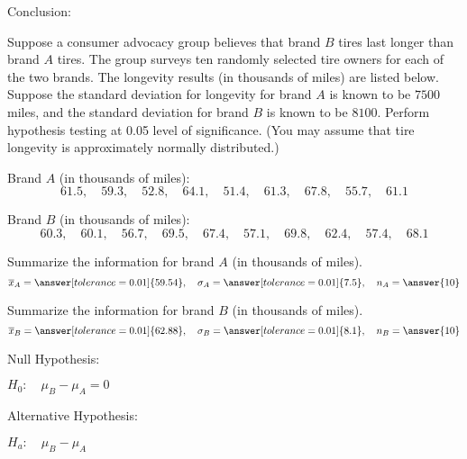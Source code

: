 \documentclass{ximera}
\begin{document}
\begin{problem}
Conclusion:

\begin{multipleChoice} 
\end{multipleChoice} 
\end{problem}

\begin{problem}\label{prob:140quiz12prob2}
Suppose a consumer advocacy group believes that brand $B$ tires last longer than brand $A$ tires.  The group surveys ten randomly selected tire owners for each of the two brands.  The longevity results (in thousands of miles) are listed below.  Suppose the standard deviation for longevity for brand $A$ is known to be $7500$ miles, and the standard deviation for brand $B$ is known to be $8100$.  Perform hypothesis testing at 0.05 level of significance. (You may assume that tire longevity is approximately normally distributed.)

Brand $A$ (in thousands of miles): $$61.5,\quad 59.3,\quad 52.8,\quad 64.1,\quad 51.4,\quad 61.3,\quad 67.8,\quad 55.7,\quad 61.1$$

Brand $B$ (in thousands of miles): $$60.3,\quad 60.1, \quad 56.7,\quad 69.5, \quad 67.4,\quad 57.1,\quad 69.8,\quad 62.4,\quad 57.4,\quad 68.1$$

Summarize the information for brand $A$ (in thousands of miles).
$$\overline{x}_A=\answer[tolerance=0.01]{59.54},\quad \sigma_A=\answer[tolerance=0.01]{7.5},\quad n_A=\answer{10}$$

Summarize the information for brand $B$ (in thousands of miles).
$$\overline{x}_B=\answer[tolerance=0.01]{62.88},\quad \sigma_B=\answer[tolerance=0.01]{8.1},\quad n_B=\answer{10}$$

Null Hypothesis:

$H_0:\quad \mu_B-\mu_A=0$ 

Alternative Hypothesis:

$H_a:\quad \mu_B-\mu_A$ 


\end{problem}
\end{document}
